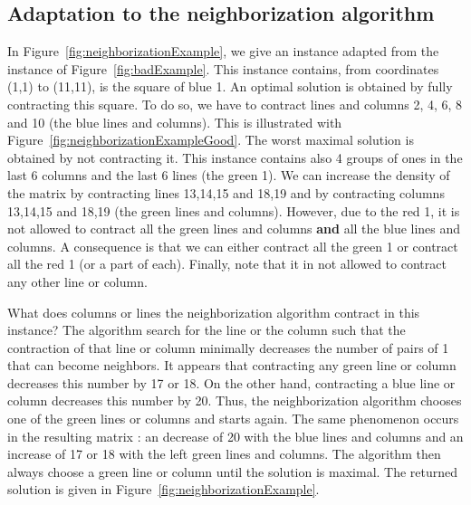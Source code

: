 \renewcommand{\gridsize}{0.5}




\subsection{Adaptation to the neighborization algorithm}

In Figure~\ref{fig:neighborizationExample}, we give an instance adapted from the instance of Figure~\ref{fig:badExample}. This instance contains, from coordinates (1,1) to (11,11), is the square of blue 1. An optimal solution is obtained by fully contracting this square. To do so, we have to contract lines and columns 2, 4, 6, 8 and 10 (the blue lines and columns). This is illustrated with Figure~\ref{fig:neighborizationExampleGood}. The worst maximal solution is obtained by not contracting it. This instance contains also 4 groups of ones in the last 6 columns and the last 6 lines (the green 1). We can increase the density of the matrix by contracting lines 13,14,15 and 18,19 and by contracting columns 13,14,15 and 18,19 (the green lines and columns). However, due to the red 1, it is not allowed to contract all the green lines and columns \textbf{and} all the blue lines and columns. A consequence is that we can either contract all the green 1 or contract all the red 1 (or a part of each). Finally, note that it in not allowed to contract any other line or column.

What does columns or lines the neighborization algorithm contract in this instance? The algorithm search for the line or the column such that the contraction of that line or column minimally decreases the number of pairs of 1 that can become neighbors. It appears that contracting any green line or column decreases this number by 17 or 18. On the other hand, contracting a blue line or column decreases this number by 20. Thus, the neighborization algorithm chooses one of the green lines or columns and starts again. The same phenomenon occurs in the resulting matrix : an decrease of 20 with the blue lines and columns and an increase of 17 or 18 with the left green lines and columns. The algorithm then always choose a green line or column until the solution is maximal. The returned solution is given in Figure~\ref{fig:neighborizationExample}.


\renewcommand{\gridsize}{0.5}




